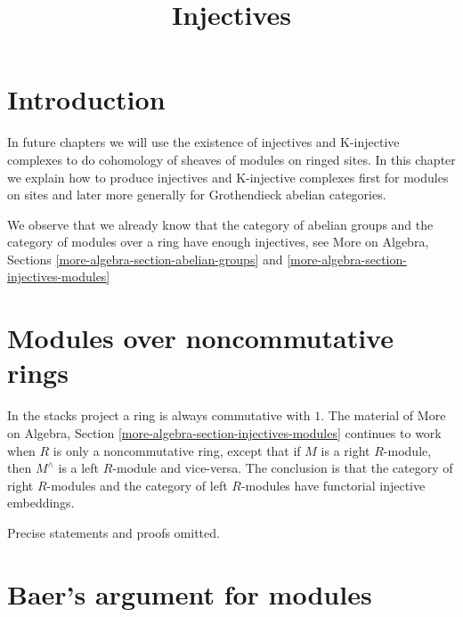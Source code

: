 

%


\title{Injectives}


\maketitle

\label{section-phantom}

\tableofcontents

\section{Introduction}
\label{section-introduction}

\noindent
In future chapters we will use the existence of injectives and
K-injective complexes to do cohomology of sheaves of modules on
ringed sites. In this chapter we explain how to produce injectives
and K-injective complexes first for modules on sites and later
more generally for Grothendieck abelian categories.

\medskip\noindent
We observe that we already know that the category of
abelian groups and the category of modules over a ring have
enough injectives, see More on Algebra, Sections
\ref{more-algebra-section-abelian-groups} and
\ref{more-algebra-section-injectives-modules}


\section{Modules over noncommutative rings}
\label{section-modules-noncommutative}

\noindent
In the stacks project a ring is always commutative with $1$.
The material of
More on Algebra, Section \ref{more-algebra-section-injectives-modules}
continues to work when $R$ is only a noncommutative ring, except that
if $M$ is a right $R$-module, then $M^\wedge$ is a left $R$-module and
vice-versa. The conclusion is that the category of right $R$-modules
and the category of left $R$-modules have functorial injective
embeddings.

\medskip\noindent
Precise statements and proofs omitted.



\section{Baer's argument for modules}
\label{section-baer}

